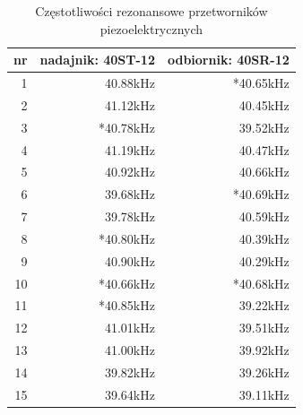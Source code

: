 \begin{table}[t]
  \centering
  \begin{tabular}{|r|r|r|}
    \hline 
    nr & nadajnik: 40ST-12 & odbiornik: 40SR-12\\
    \hline
    1  &   40.88kHz & *40.65kHz \\
    2  &   41.12kHz &  40.45kHz \\
    3  &  *40.78kHz &  39.52kHz \\
    4  &   41.19kHz &  40.47kHz \\
    5  &   40.92kHz &  40.66kHz \\
    6  &   39.68kHz & *40.69kHz \\
    7  &   39.78kHz &  40.59kHz \\
    8  &  *40.80kHz &  40.39kHz \\
    9  &   40.90kHz &  40.29kHz \\
    10 &  *40.66kHz & *40.68kHz \\
    11 &  *40.85kHz &  39.22kHz \\
    12 &   41.01kHz &  39.51kHz \\
    13 &   41.00kHz &  39.92kHz \\
    
    14 &   39.82kHz &  39.26kHz \\
    15 &   39.64kHz &  39.11kHz \\
    \hline
  \end{tabular}
  \caption{Częstotliwości rezonansowe przetworników piezoelektrycznych}
  \label{table:czestotliwosci}
\end{table}


